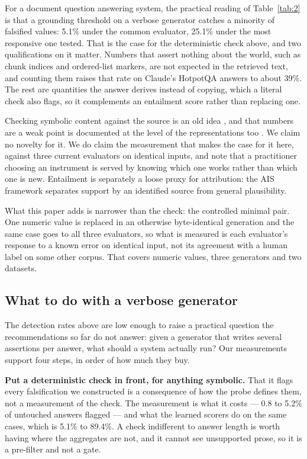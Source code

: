 \documentclass[11pt]{article}
\begin{document}
For a document question answering system, the practical reading of Table~\ref{tab:2} is that a grounding threshold on a verbose generator catches a minority of falsified values: 5.1\% under the common evaluator, 25.1\% under the most responsive one tested. That is the case for the deterministic check above, and two qualifications on it matter. Numbers that assert nothing about the world, such as chunk indices and ordered-list markers, are not expected in the retrieved text, and counting them raises that rate on Claude's HotpotQA answers to about 39\%. The rest are quantities the answer derives instead of copying, which a literal check also flags, so it complements an entailment score rather than replacing one.

Checking symbolic content against the source is an old idea \citep{goodrich-etal-2019, nan-etal-2021, zhao-etal-2020}, and that numbers are a weak point is documented at the level of the representations too \citep{wallace-etal-2019}. We claim no novelty for it. We do claim the measurement that makes the case for it here, against three current evaluators on identical inputs, and note that a practitioner choosing an instrument is served by knowing which one works rather than which one is new. Entailment is separately a loose proxy for attribution: the AIS framework \citep{rashkin-etal-2023} separates support by an identified source from general plausibility.

What this paper adds is narrower than the check: the controlled minimal pair. One numeric value is replaced in an otherwise byte-identical generation and the same case goes to all three evaluators, so what is measured is each evaluator's response to a known error on identical input, not its agreement with a human label on some other corpus. That covers numeric values, three generators and two datasets.




\subsection{What to do with a verbose generator}
\label{sec:deploy}

The detection rates above are low enough to raise a practical question the recommendations so far do not answer: given a generator that writes several assertions per answer, what should a system actually run? Our measurements support four steps, in order of how much they buy.

\textbf{Put a deterministic check in front, for anything symbolic.} That it flags every falsification we constructed is a consequence of how the probe defines them, not a measurement of the check. The measurement is what it costs --- 0.8 to 5.2\% of untouched answers flagged --- and what the learned scorers do on the same cases, which is 5.1\% to 89.4\%. A check indifferent to answer length is worth having where the aggregates are not, and it cannot see unsupported prose, so it is a pre-filter and not a gate.
\end{document}
